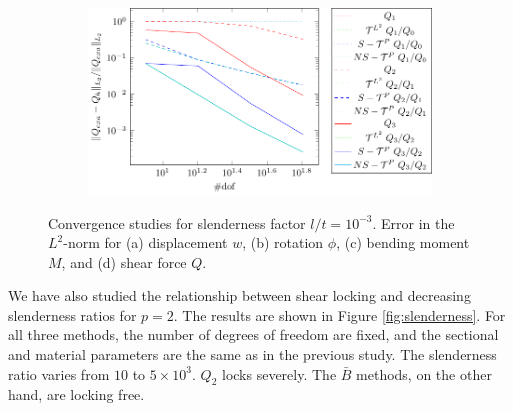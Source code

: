 \begin{figure}
\begin{subfigure}[b]{0.49\linewidth}
        \caption{}
        \vspace*{2mm}
    \end{subfigure}
    \begin{subfigure}[b]{0.49\linewidth}        %
        \centering
        \includegraphics[width=\linewidth]{Q-sin}
        \caption{}
        \vspace*{2mm}
    \end{subfigure}
    \caption{Convergence studies for slenderness factor $l/t=10^{-3}$. Error in the $L^2$-norm for (a) displacement $w$, (b) rotation $\phi$, (c) bending moment $M$, and (d) shear force $Q$.}
    \label{fig:timoshenko_result}
\end{figure}

We have also studied the relationship between shear locking and decreasing slenderness ratios for $p=2$. The results are shown in Figure \ref{fig:slenderness}. For all three methods, the number of degrees of freedom are fixed, and the sectional and material parameters are the same as in the previous study. The slenderness ratio varies from $10$ to $5\times{10}^3$. $Q_2$ locks severely. The $\bar{B}$ methods, on the other hand, are locking free.

